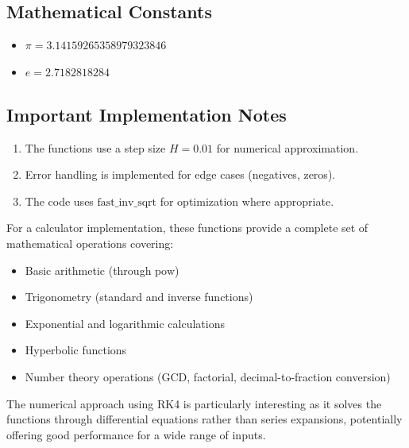 \documentclass[journal]{IEEEtran}
\numberwithin{equation}{enumi}
\numberwithin{figure}{enumi}
\begin{document}
\subsection{Mathematical Constants}
\begin{itemize}
    \item $\pi = 3.14159265358979323846$
    \item $e = 2.7182818284$
\end{itemize}

\subsection{Important Implementation Notes}
\begin{enumerate}
    \item The functions use a step size $H = 0.01$ for numerical approximation.
    \item Error handling is implemented for edge cases (negatives, zeros).
    \item The code uses $\text{fast\_inv\_sqrt}$ for optimization where appropriate.
\end{enumerate}

For a calculator implementation, these functions provide a complete set of mathematical operations covering:
\begin{itemize}
    \item Basic arithmetic (through $\text{pow}$)
    \item Trigonometry (standard and inverse functions)
    \item Exponential and logarithmic calculations
    \item Hyperbolic functions
    \item Number theory operations (GCD, factorial, decimal-to-fraction conversion)
\end{itemize}

The numerical approach using RK4 is particularly interesting as it solves the functions through differential equations rather than series expansions, potentially offering good performance for a wide range of inputs.

% 
\end{document}
